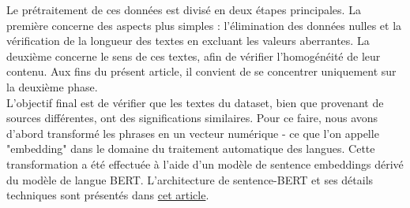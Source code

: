 Le prétraitement de ces données est divisé en deux étapes principales. La première concerne des aspects plus simples : l'élimination des données nulles et la vérification de la longueur des textes en excluant les valeurs aberrantes. La deuxième concerne le sens de ces textes, afin de vérifier l'homogénéité de leur contenu. Aux fins du présent article, il convient de se concentrer uniquement sur la deuxième phase.
\\

L'objectif final est de vérifier que les textes du dataset, bien que provenant de sources différentes, ont des significations similaires. Pour ce faire, nous avons d'abord transformé les phrases en un vecteur numérique - ce que l'on appelle "embedding" dans le domaine du traitement automatique des langues. Cette transformation a été effectuée à l'aide d'un modèle de sentence embeddings dérivé du modèle de langue BERT. L'architecture de sentence-BERT et ses détails techniques sont présentés dans {\color{red} \href{https://arxiv.org/abs/1908.10084}{cet article}}.     